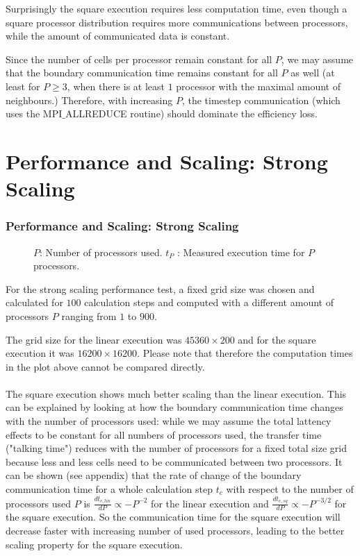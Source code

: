 \documentclass[8pt]{beamer}
\begin{document}
\begin{frame}
	
	Surprisingly the square execution requires less computation time, even though a square processor distribution requires more communications between processors, while the amount of communicated data is constant.
	
	Since the number of cells per processor remain constant for all $P$, we may assume that the boundary communication time remains constant for all $P$ as well (at least for $P \geq 3$, when there is at least $1$ processor with the maximal amount of neighbours.) Therefore, with increasing $P$, the timestep communication (which uses the MPI$\_$ALLREDUCE routine) should dominate the efficiency loss.
\end{frame}


\section{Performance and Scaling: Strong Scaling}

\begin{frame}
	\frametitle{Performance and Scaling: Strong Scaling}
	
	\begin{figure}[H!]
		\caption*{$P$: Number of processors used. $t_P$ : Measured execution time for $P$ processors.}	
	\end{figure}
	
	For the strong scaling performance test, a fixed grid size was chosen and calculated for $100$ calculation steps and computed with a different amount of processors $P$ ranging from $1$ to $900$.
	
	The grid size for the linear execution was $45360 \times 200$ and for the square execution it was $16200 \times 16200$. Please note that therefore the computation times in the plot above cannot be compared directly.\\~\\
	
	
	
	The square execution shows much better scaling than the linear execution. This can be explained by looking at how the boundary communication time changes with the number of processors used: while we may assume the total lattency effects to be constant for all numbers of processors used, the transfer time ("talking time") reduces with the number of  
	processors for a fixed total size grid because less and less cells need to be communicated between two processors. It can be shown (see appendix) that the rate of change of the boundary communication time for a whole calculation step $t_c$ with respect to the number of processors used $P$ is $\frac{dt_{c, lin}}{dP} \propto -P^{-2}$ for the linear execution and $\frac{dt_{c, sq}}{dP} \propto -P^{-3/2}$ for the square execution. So the communication time for the square execution will decrease faster with increasing number of used processors, leading to the better scaling property for the square execution.

\end{frame}
\end{document}
